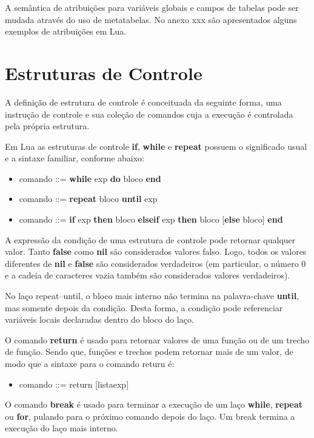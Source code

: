 \documentclass[
12pt, %
openright, %
oneside, %
a4paper, %
english, %
brazil, %
]{abntex2}
\begin{document}
A semântica de atribuições para variáveis globais e campos de tabelas pode ser mudada através do uso de metatabelas. No anexo xxx são apresentados alguns exemplos de atribuições em Lua.


\chapter{Estruturas de Controle}
A definição de estrutura de controle é conceituada da seguinte forma, uma instrução de controle e sua coleção de comandos cuja a execução é controlada pela própria estrutura.

Em Lua as estruturas de controle \textbf{if}, \textbf{while} e \textbf{repeat} possuem o significado usual e a sintaxe familiar, conforme abaixo:

\begin{itemize}
\item comando ::= \textbf{while} exp \textbf{do} bloco \textbf{end}
\item comando ::= \textbf{repeat} bloco \textbf{until} exp
\item comando ::= \textbf{if} exp \textbf{then} bloco {\textbf{elseif} exp \textbf{then} bloco} [\textbf{else} bloco] \textbf{end}
\end{itemize}

A expressão da condição de uma estrutura de controle pode retornar qualquer valor. Tanto \textbf{false} como \textbf{nil} são considerados valores falso. Logo, todos os valores diferentes de \textbf{nil} e \textbf{false} são considerados verdadeiros (em particular, o número 0 e a cadeia de caracteres vazia também são considerados valores verdadeiros).

No laço repeat–until, o bloco mais interno não termina na palavra-chave \textbf{until}, mas somente depois da condição. Desta forma, a condição pode referenciar variáveis locais declaradas dentro do bloco do laço.

O comando \textbf{return} é usado para retornar valores de uma função ou de um trecho de função. Sendo que, funções e trechos podem retornar mais de um valor, de modo que a sintaxe para o comando return é:

\begin{itemize}
\item comando ::= return [listaexp]
\end{itemize}

O comando \textbf{break} é usado para terminar a execução de um laço \textbf{while}, \textbf{repeat} ou \textbf{for}, pulando para o próximo comando depois do laço. Um break termina a execução do laço mais interno.
\end{document}
